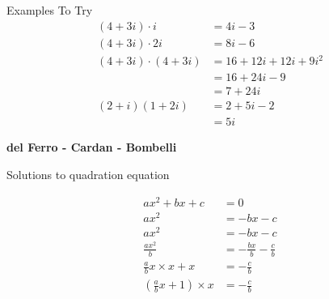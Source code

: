 \documentclass{article}
\begin{document}
Examples To Try
\begin{align*}
(4 + 3i)\cdot i &=  4i -3\\
(4 + 3i)\cdot 2i &=  8i -6\\
(4 + 3i)\cdot (4 + 3i) &=  16 + 12i + 12i + 9i^2\\
&= 16 + 24i -9\\
&= 7 + 24i\\
(2 + i)(1 + 2i) &= 2 + 5i -2\\
&= 5i
\end{align*} 


\textbf{del Ferro - Cardan - Bombelli}

Solutions to quadration equation

\begin{align*}
ax^2 + bx + c &= 0\\
ax^2 &= -bx - c\\
ax^2 &= -bx - c\\
\frac{ax^2}{b} &= -\frac{bx}{b} - \frac{c}{b}\\ 
\frac{a}{b}x\times x + x&= -\frac{c}{b}\\
(\frac{a}{b}x + 1)\times x &= -\frac{c}{b}
\end{align*}
\end{document}
